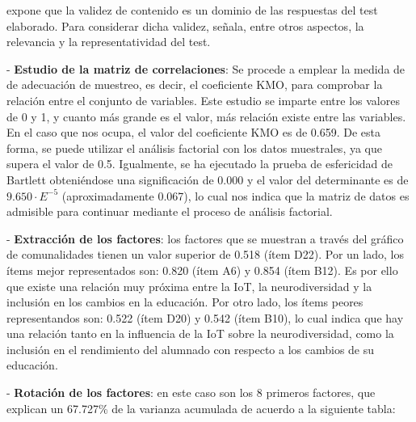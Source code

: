 \documentclass[spanish]{textolivre}
\begin{document}
\textcite{messick_standard_1975} expone que la validez de contenido es un dominio de las respuestas del test elaborado. Para considerar dicha validez, señala, entre otros aspectos, la relevancia y la representatividad del test.

- \textbf{Estudio de la matriz de correlaciones}: Se procede a emplear la medida de \textcite{kaiser_second_1970,kaiser_index_1974} de adecuación de muestreo, es decir, el coeficiente KMO, para comprobar la relación entre el conjunto de variables. Este estudio se imparte entre los valores de 0 y 1, y cuanto más grande es el valor, más relación existe entre las variables. En el caso que nos ocupa, el valor del coeficiente KMO es de 0.659. De esta forma, se puede utilizar el análisis factorial con los datos muestrales, ya que supera el valor de 0.5. Igualmente, se ha ejecutado la prueba de esfericidad de Bartlett obteniéndose una significación de 0.000 y el valor del determinante es de $9.650\cdot E^{-5}$ (aproximadamente 0.067), lo cual nos indica que la matriz de datos es admisible para continuar mediante el proceso de análisis factorial.

- \textbf{Extracción de los factores}: los factores que se muestran a través del gráfico de comunalidades tienen un valor superior de 0.518 (ítem D22). Por un lado, los ítems mejor representados son: 0.820 (ítem A6) y 0.854 (ítem B12). Es por ello que existe una relación muy próxima entre la IoT, la neurodiversidad y la inclusión en los cambios en la educación. Por otro lado, los ítems peores representandos son: 0.522 (ítem D20) y 0.542 (ítem B10), lo cual indica que hay una relación tanto en la influencia de la IoT sobre la neurodiversidad, como la inclusión en el rendimiento del alumnado con respecto a los cambios de su educación.

- \textbf{Rotación de los factores}: en este caso son los 8 primeros factores, que explican un
67.727\% de la varianza acumulada de acuerdo a la siguiente tabla:
\end{document}
